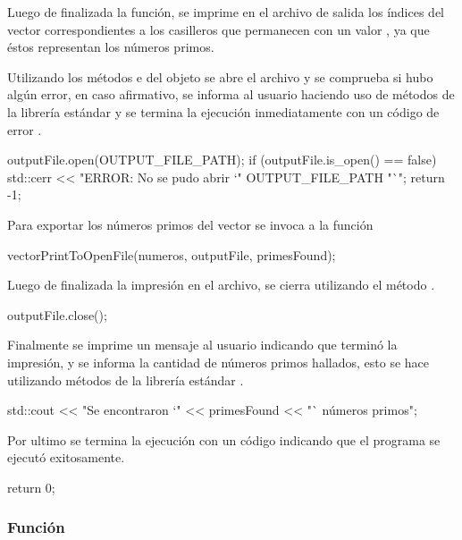 \documentclass[12pt]{article}
\newenvironment{fullgrayverb}
{\verbbox}
{\endverbbox\par\colorbox{gray!25}{\parbox{\textwidth}{\theverbbox}}\par}
\begin{document}
Luego de finalizada la función, se imprime en el archivo de salida los índices
del vector correspondientes a los casilleros que permanecen con un valor
, ya que éstos representan los números primos.

Utilizando los métodos  e  del objeto
 se abre el archivo  y se comprueba si hubo
algún error, en caso afirmativo, se informa al usuario haciendo uso de métodos
de la librería estándar  y se termina la ejecución inmediatamente
con un código de error .

\begin{fullgrayverb}[\mbox{}]
outputFile.open(OUTPUT_FILE_PATH);
if (outputFile.is_open() == false) {
    std::cerr << "ERROR: No se pudo abrir `" OUTPUT_FILE_PATH "`\n";
    return -1;
}
\end{fullgrayverb}

Para exportar los números primos del vector se invoca a la función
\linebreak{}

\begin{fullgrayverb}[\mbox{}]
vectorPrintToOpenFile(numeros, outputFile, primesFound);
\end{fullgrayverb}

Luego de finalizada la impresión en el archivo, se cierra utilizando el método
.

\begin{fullgrayverb}[\mbox{}]
outputFile.close();
\end{fullgrayverb}

Finalmente se imprime un mensaje al usuario indicando que terminó la impresión,
y se informa la cantidad de números primos hallados, esto se hace utilizando
métodos de la librería estándar .

\begin{fullgrayverb}[\mbox{}]
std::cout << "Se encontraron `" << primesFound << "` números primos\n";
\end{fullgrayverb}

Por ultimo se termina la ejecución con un código  indicando que el
programa se ejecutó exitosamente.

\begin{fullgrayverb}[\mbox{}]
return 0;
\end{fullgrayverb}

\subsubsection{Función }
\end{document}
